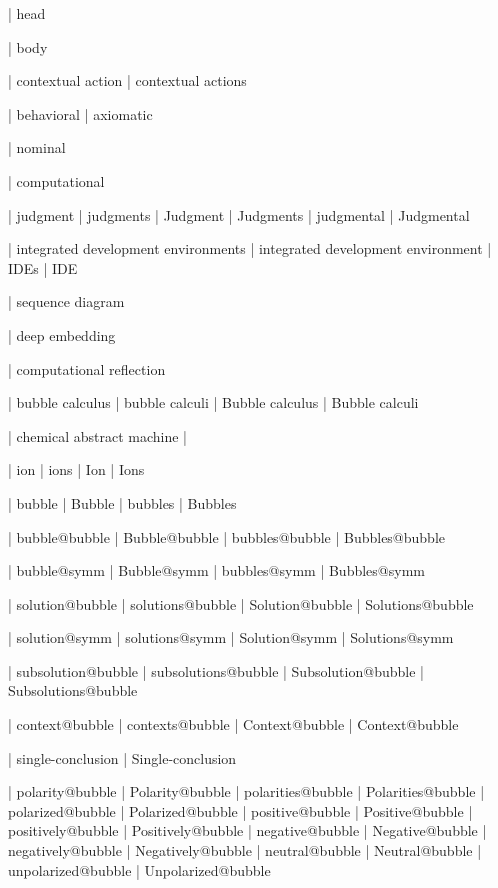  | head

 | body

 | contextual action
 | contextual actions
 
 | behavioral
 | axiomatic

 | nominal

 | computational

 | judgment
 | judgments
 | Judgment
 | Judgments
 | judgmental
 | Judgmental


 | integrated development environments
 | integrated development environment
 | IDEs
 | IDE

 | sequence diagram

 | deep embedding

 | computational reflection


 | bubble calculus
 | bubble calculi
 | Bubble calculus
 | Bubble calculi

 | chemical abstract machine
 | \cham
 
 | ion
 | ions
 | Ion
 | Ions

 | bubble
 | Bubble
 | bubbles
 | Bubbles

 | bubble@bubble
 | Bubble@bubble
 | bubbles@bubble
 | Bubbles@bubble

 | bubble@symm
 | Bubble@symm
 | bubbles@symm
 | Bubbles@symm

 | solution@bubble
 | solutions@bubble
 | Solution@bubble
 | Solutions@bubble

 | solution@symm
 | solutions@symm
 | Solution@symm
 | Solutions@symm

 | subsolution@bubble
 | subsolutions@bubble
 | Subsolution@bubble
 | Subsolutions@bubble

 | context@bubble
 | contexts@bubble
 | Context@bubble
 | Context@bubble

 | single-conclusion
 | Single-conclusion

 | polarity@bubble
 | Polarity@bubble
 | polarities@bubble
 | Polarities@bubble
 | polarized@bubble
 | Polarized@bubble
 | positive@bubble
 | Positive@bubble
 | positively@bubble
 | Positively@bubble
 | negative@bubble
 | Negative@bubble
 | negatively@bubble
 | Negatively@bubble
 | neutral@bubble
 | Neutral@bubble
 | unpolarized@bubble
 | Unpolarized@bubble

